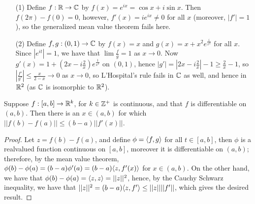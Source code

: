 \begin{example}
    \begin{enumerate}
        \item[(1)] Define $f:\mathbb{R} \rightarrow \mathbb{C}$ by $f(x)=e^{ix}=\cos{x}+i\sin{x}$. Then $f(2\pi)-f(0)=0$,
            however, $f'(x)=ie^{ix} \neq 0$ for all $x$ (moreover, $|f'|=1$), so the
            generalized mean value theorem fails here.

        \item[(2)] Define $f,g:(0,1) \rightarrow \mathbb{C}$ by  $f(x)=x$ and $g(x)=x+x^2e^{\frac{i}{x^2}}$
            for all $x$. Since $|e^{it}|=1$, we have that $\lim{\frac{f}{g}}=1$ as $x \rightarrow 0$.
            Now  $g'(x)=1+(2x-i\frac{2}{x})e^{\frac{1}{x^2}}$ on $(0,1)$, hence  $|g'|=
            |2x-i\frac{2}{x}|-1 \geq \frac{2}{x}-1$, so $|\frac{f'}{g'}| \leq \frac{x}{2-x} \rightarrow 0$
            as $x \rightarrow 0$, so L'Hospital's rule fails in  $\mathbb{C}$ as well, and hence in  $\mathbb{R}^2$
            (as $\mathbb{C}$ is isomorphic to  $\mathbb{R}^2$).
    \end{enumerate}
\end{example}

\begin{theorem}\label{6.6.1}
    Suppose $f:[a,b] \rightarrow \mathbb{R}^k$, for  $k \in \mathbb{Z}^+$ is continuous, and that $f$ is
    differentiable on  $(a,b)$. Then there is an  $x \in (a,b)$ for which $||f(b)-f(a)|| \leq (b-a)||f'(x)||$.
\end{theorem}
\begin{proof}
    Let $z=f(b)-f(a)$, and define  $\phi=\langle f,g\rangle$ for all  $t \in [a,b]$, then $\phi$
    is a realvalued function continuous on $[a,b]$, moreover it is differentiable on  $(a,b)$; therefore,
    by the mean value theorem,  $\phi(b)-\phi(a)=(b-a)\phi'(a)=(b-a)\langle z,f'(x)\rangle$ for  $x \in  (a,b)$.
    On the other hand, we have that $\phi(b)-\phi(a)=\langle z,z\rangle=||z||^2$, hence, by the Cauchy
    Schwarz inequality, we have that $||z||^2=(b-a)\langle z,f'\rangle \leq ||z||||f'||$,  which gives
    the desired result.
\end{proof}
